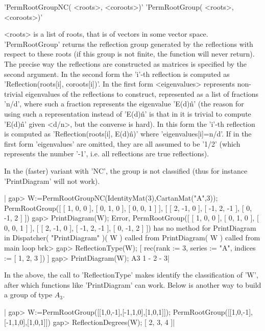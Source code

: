 'PermRootGroupNC( <roots>, <coroots>)'
'PermRootGroup( <roots>, <coroots>)'

<roots>  is  a  list  of  roots,  that  is of vectors in some vector space.
'PermRootGroup'  returns the reflection group  generated by the reflections
with respect to these roots (if this group is not finite, the function will
never  return). The precise way the reflections are constructed as matrices
is  specified  by  the  second  argument.  In  the  second  form the 'i'-th
reflection  is computed as 'Reflection(roots[i], coroots[i])'. In the first
form <eigenvalues> represents non-trivial eigenvalues of the reflections to
construct,  represented as a list of fractions 'n/d', where such a fraction
represents   the  eigenvalue  'E(d)\^n'  (the   reason  for  using  such  a
representation  instead of  'E(d)\^n' is  that in  {\GAP} it  is trivial to
compute  'E(d)\^n' given <d/n>, but the converse is hard). In this form the
'i'-th  reflection  is  computed  as  'Reflection(roots[i], E(d)\^n)' where
'eigenvalues[i]=n/d'.  If in the first form 'eigenvalues' are omitted, they
are  all assumed to  be '1/2' (which  represents the number  '-1', i.e. all
reflections are true reflections).

In  the (faster) variant with  'NC', the group is  not classified (thus for
instance 'PrintDiagram' will not work).

|    gap> W:=PermRootGroupNC(IdentityMat(3),CartanMat("A",3));
    PermRootGroup([ [ 1, 0, 0 ], [ 0, 1, 0 ], [ 0, 0, 1 ] ],
      [ [ 2, -1, 0 ], [ -1, 2, -1 ], [ 0, -1, 2 ] ])
    gap> PrintDiagram(W);
    Error, PermRootGroup([ [ 1, 0, 0 ], [ 0, 1, 0 ], [ 0, 0, 1 ] ],
      [ [ 2, -1, 0 ], [ -1, 2, -1 ], [ 0, -1, 2 ] ]) has no method
    for PrintDiagram in
    Dispatcher( "PrintDiagram" )( W ) called from
    PrintDiagram( W ) called from
    main loop
    brk>
    gap> ReflectionType(W);
    [ rec(rank    := 3,
          series  := "A",
          indices := [ 1, 2, 3 ]) ]
    gap> PrintDiagram(W);
    A3 1 - 2 - 3|

In the above, the call  to 'ReflectionType' makes {\CHEVIE} identify the
classification  of 'W',  after which  functions like  'PrintDiagram' can
work. Below is another way to build a group of type $A_3$.

|    gap> W:=PermRootGroup([[1,0,-1],[-1,1,0],[1,0,1]]);
    PermRootGroup([[1,0,-1],[-1,1,0],[1,0,1]])
    gap> ReflectionDegrees(W);
    [ 2, 3, 4 ]|

%
%

